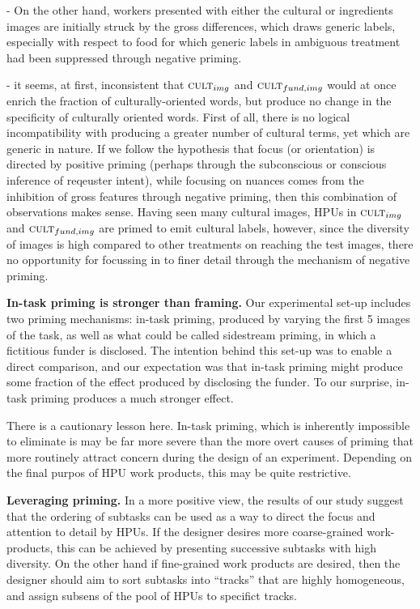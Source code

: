 \documentclass[letterpaper, 11pt, twocolumn]{article}
\begin{document}
- On the other hand, workers presented with either the cultural or ingredients images are initially struck by the gross differences, which draws generic 
labels, especially with respect to food for which generic labels in ambiguous treatment had been suppressed through negative priming.

- it seems, at first, inconsistent that $\textsc{cult}_{img}$ and 
$\textsc{cult}_{fund,img}$ would at once enrich the fraction of 
culturally-oriented words, but produce no change in the specificity of 
culturally oriented words.  First of all, there is no logical incompatibility
with producing a greater number of cultural terms, yet which are generic 
in nature.  If we follow the hypothesis that focus (or orientation) is directed
by positive priming (perhaps through the subconscious or conscious inference
of reqeuster intent), while focusing on nuances comes from the inhibition
of gross features through negative priming, then this combination of observations makes sense.  Having seen many cultural images, HPUs in 
$\textsc{cult}_{img}$ and $\textsc{cult}_{fund,img}$ are primed to emit 
cultural labels, however, since the diversity of images is high compared to
other treatments on reaching the test images, there no opportunity for 
focussing in to finer detail through the mechanism of negative priming.

\textbf{In-task priming is stronger than framing.}
Our experimental set-up includes two priming mechanisms: in-task priming, 
produced by varying the first 5 images of the task, as well as what could be
called sidestream priming, in which a fictitious funder is disclosed.
The intention behind this set-up was to enable a direct comparison, and 
our expectation was that in-task priming might produce some fraction of the
effect produced by disclosing the funder.  To our surprise, in-task priming 
produces a much stronger effect.

There is a cautionary lesson here.  In-task priming, which is inherently 
impossible to eliminate is may be far more severe than the more overt causes 
of priming that more routinely attract concern during the design of an 
experiment.   Depending on the final purpos of HPU work products, this may be
quite restrictive.

\textbf{Leveraging priming.}
In a more positive view, the results of our study suggest that the ordering 
of subtasks can be used as a way to direct the focus and attention to detail
by HPUs.  If the designer desires more coarse-grained work-products, this
can be achieved by presenting successive subtasks with high diversity.  On 
the other hand if fine-grained work products are desired, then the designer
should aim to sort subtasks into ``tracks'' that are highly homogeneous,
and assign subsens of the pool of HPUs to specifict tracks.
\end{document}
